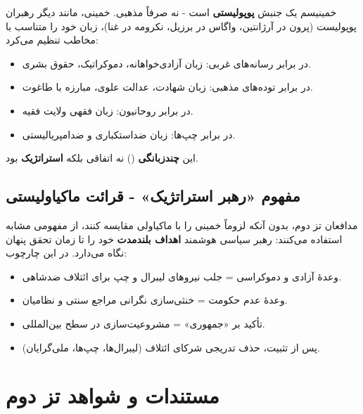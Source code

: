 \documentclass[12pt,a4paper]{book}
\newcommand{\keyword}[1]{\textbf{\textcolor{cPrimary}{#1}}}
\newcommand{\en}[1]{\lr{\textit{#1}}}
\begin{document}
\begin{principleBox}
خمینیسم یک جنبش \keyword{پوپولیستی} است - نه صرفاً مذهبی. خمینی، مانند دیگر رهبران پوپولیست (پرون در آرژانتین، واگاس در برزیل، نکرومه در غنا)، زبان خود را متناسب با مخاطب تنظیم می‌کرد:

\begin{itemize}[label=\textcolor{cPrimary}{$\bullet$}, rightmargin=2em]
    \item در برابر رسانه‌های غربی: زبان آزادی‌خواهانه، دموکراتیک، حقوق بشری.
    \item در برابر توده‌های مذهبی: زبان شهادت، عدالت علوی، مبارزه با طاغوت.
    \item در برابر روحانیون: زبان فقهی ولایت فقیه.
    \item در برابر چپ‌ها: زبان ضداستکباری و ضدامپریالیستی.
\end{itemize}

این \keyword{چندزبانگی} (\en{code-switching}) نه اتفاقی بلکه \keyword{استراتژیک} بود.
\end{principleBox}

\subsection{مفهوم «رهبر استراتژیک» - قرائت ماکیاولیستی}

مدافعان تز دوم، بدون آنکه لزوماً خمینی را با ماکیاولی مقایسه کنند، از مفهومی مشابه استفاده می‌کنند: رهبر سیاسی هوشمند \keyword{اهداف بلندمدت} خود را تا زمان تحقق پنهان نگاه می‌دارد. در این چارچوب:

\begin{itemize}[label=\textcolor{cAccent}{$\blacktriangleright$}, rightmargin=2em]
    \item وعدهٔ آزادی و دموکراسی = جلب نیروهای لیبرال و چپ برای ائتلاف ضدشاهی.
    \item وعدهٔ عدم حکومت = خنثی‌سازی نگرانی مراجع سنتی و نظامیان.
    \item تأکید بر «جمهوری» = مشروعیت‌سازی در سطح بین‌المللی.
    \item پس از تثبیت، حذف تدریجی شرکای ائتلاف (لیبرال‌ها، چپ‌ها، ملی‌گرایان).
\end{itemize}

\section{مستندات و شواهد تز دوم}
\end{document}
